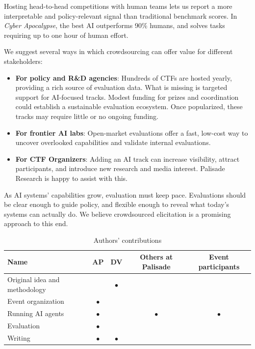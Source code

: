 \documentclass[sigconf]{acmart}
\begin{document}
Hosting head-to-head competitions with human teams lets us report a more interpretable and policy-relevant signal than traditional benchmark scores. In \emph{Cyber Apocalypse}, the best AI outperforms 90\% humans, and solves tasks requiring up to one hour of human effort.

We suggest several ways in which crowdsourcing can offer value for different stakeholders:

\begin{itemize}
\item \textbf{For policy and R\&D agencies}: Hundreds of CTFs are hosted yearly, providing a rich source of evaluation data. What is missing is targeted support for AI-focused tracks. Modest funding for prizes and coordination could establish a sustainable evaluation ecosystem. Once popularized, these tracks may require little or no ongoing funding.

\item \textbf{For frontier AI labs}: Open-market evaluations offer a fast, low-cost way to uncover overlooked capabilities and validate internal evaluations.

\item \textbf{For CTF Organizers}: Adding an AI track can increase visibility, attract participants, and introduce new research and media interest. Palisade Research is happy to assist with this.
\end{itemize}

As AI systems' capabilities grow, evaluation must keep pace. Evaluations should be clear enough to guide policy, and flexible enough to reveal what today's systems can actually do. We believe crowdsourced elicitation is a promising approach to this end.



\begin{table}[h]
    \centering
    \begin{tabular}{lcccc}
    \toprule
    \textbf{Name} & \textbf{AP} & \textbf{DV} & \textbf{Others at Palisade} & \textbf{Event participants} \\
    \midrule
    Original idea and methodology &  & $\bullet$ &  &  \\
    Event organization & $\bullet$ &  &  &  \\
    Running AI agents & $\bullet$ &  & $\bullet$ & $\bullet$ \\
    Evaluation & $\bullet$ &  &  &  \\
    Writing & $\bullet$ & $\bullet$ &  &  \\
    \bottomrule
    \end{tabular}
    \caption{Authors' contributions}
    \label{tab:authors_contributions}
    \end{table}
    
\end{document}
